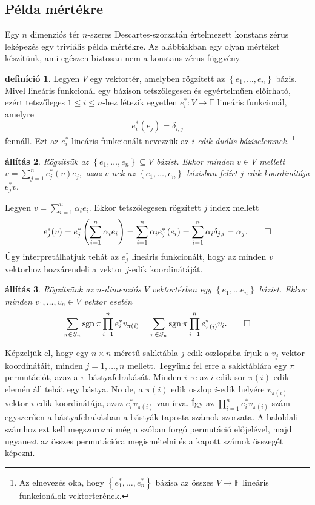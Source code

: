 \documentclass[a4paper, showtrims]{memoir}
\makeatletter
\renewenvironment{proof}[1][\proofname]
    {\par\pushQED{\qed}%
    \normalfont \topsep6\p@\@plus6\p@\relax
    \trivlist
    \item[\hskip\labelsep
        \itshape
    #1\@addpunct{:}]\ignorespaces}
    {\popQED\endtrivlist\@endpefalse}
\theoremstyle{plain}
\newtheorem{proposition}{állítás}[chapter]
\theoremstyle{remark}
\theoremstyle{definition}
\newtheorem{definition}[proposition]{definíció}
\DeclareMathOperator{\sgn}{sgn}
\makeatother
\begin{document}
\subsection{Példa mértékre}
Egy $n$ dimenziós tér $n$-szeres Descartes-szorzatán értelmezett konstans zérus leképezés egy
triviális példa mértékre.
Az alábbiakban egy olyan mértéket készítünk, ami egészen biztosan nem a konstans zérus függvény.
\begin{definition}
	Legyen $V$ egy vektortér, amelyben rögzített az $\left\{ e_1,\ldots,e_n \right\}$
	bázis.
	Mivel lineáris funkcionál egy bázison tetszőlegesen és egyértelműen előírható,
	ezért tetszőleges $1\leq i\leq n$-hez létezik egyetlen $e_i^\ast:V\to\mathbb{F}$
	lineáris funkcionál, amelyre
	\[
		e_i^\ast(e_j)=\delta_{i,j}
	\]
	fennáll.
	Ezt az $e_i^\ast$ lineáris funkcionált nevezzük az \emph{$i$-edik duális báziselemnek.}%
	\footnote
	{
		Az elnevezés oka,
		hogy $\left\{ e_1^\ast,\ldots,e_n^\ast \right\}$ bázisa az összes $V\to\mathbb{F}$ lineáris funkcionálok vektorterének.
	}
\end{definition}
\begin{proposition}
	Rögzítsük az $\left\{ e_1,\ldots,e_n \right\}\subseteq V$ bázist.
	Ekkor minden $v\in V$ mellett
	\(
	v=\sum_{j=1}^ne_j^\ast(v)e_j,
	\)
	azaz $v$-nek az $\left\{ e_1,\ldots,e_n \right\}$ bázisban felírt $j$-edik koordinátája $e_j^\ast v.$
\end{proposition}
\begin{proof}
	Legyen $v=\sum_{i=1}^n\alpha_ie_i$.
	Ekkor tetszőlegesen rögzített $j$ index mellett
	\[
	e_j^\ast(v)
	=
	e_j^\ast\left( \sum_{i=1}^n\alpha_ie_i \right)
	=
	\sum_{i=1}^n\alpha_ie_j^\ast\left( e_i \right)
	=
	\sum_{i=1}^n\alpha_i\delta_{j,i}
	=
	\alpha_j.
    \qedhere
    \]
\end{proof}
Úgy interpretálhatjuk tehát az $e_j^\ast$ lineáris funkcionált,
hogy az minden $v$ vektorhoz hozzárendeli a vektor $j$-edik koordinátáját.
\begin{proposition}
	Rögzítsünk az $n$-dimenziós $V$ vektortérben egy $\left\{ e_{1},\ldots e_{n}\right\} $ bázist.
	Ekkor minden $v_1,\ldots,v_n\in V$ vektor esetén
	\[
		\sum_{\pi \in S_{n}}\sgn\pi\prod_{i=1}^{n}e_{i}^{\ast }v_{\pi \left( i\right)}
		=
		\sum_{\pi \in S_{n}}\sgn\pi\prod_{i=1}^{n}e_{\pi \left( i\right)}^{\ast }v_{i}.
	    \qedhere
	\]
\end{proposition}
Képzeljük el, hogy egy $n\times n$ méretű sakktábla $j$-edik oszlopába írjuk a $v_j$ vektor koordinátáit,
minden $j=1,\ldots,n$ mellett.
Tegyünk fel erre a sakktáblára egy $\pi$ permutációt, azaz a $\pi$ bástyafelrakását.
Minden $i$-re az $i$-edik sor $\pi\left( i \right)$-edik elemén áll tehát egy bástya.
No de, a $\pi\left( i \right)$ edik oszlop $i$-edik helyére $v_{\pi\left( i \right)}$ vektor $i$-edik koordinátája,
azaz $e_i^\ast v_{\pi(i)}$ van írva.
Így az $\prod_{i=1}^n e_i^\ast v_{\pi\left( i \right)}$ szám egyszerűen a bástyafelrakásban a bástyák taposta számok szorzata.
A baloldali számhoz ezt kell megszorozni még a szóban forgó permutáció előjelével,
majd ugyanezt az összes permutációra megismételni és a kapott számok összegét képezni.
\end{document}
